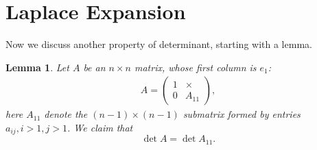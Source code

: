\documentclass[11pt]{book}
\newtheorem{lemma}[theorem]{Lemma}
\theoremstyle{definition}
\numberwithin{equation}{chapter}
\begin{document}
\medskip

\section{Laplace Expansion}
Now we discuss another property of determinant, starting with a lemma.

\medskip

\begin{lemma}\label{lemma_determinant}
Let $A$ be an $n\times n$ matrix, whose first column is $e_1$:
\begin{align*}
    A = \left(
    \begin{matrix}
        1 & \times\\
        0 & A_{11}
    \end{matrix}
    \right),
\end{align*}
here $A_{11}$ denote the $(n-1)\times(n-1)$ submatrix formed by entries $a_{ij},i>1, j>1$. We claim that $$\det A = \det A_{11}.$$
\end{lemma}
\end{document}
